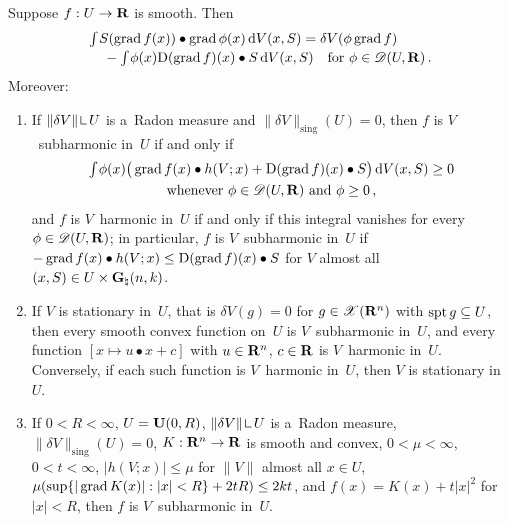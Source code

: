 \begin{lemma}
    \label{al:7.5(2)}
    Suppose $f : U \to \mathbf{R}$ is smooth. Then
    \begin{equation}
        \label{eq:7.5(2):1}
        \begin{multlined}
        \textint{}{} S(\grad f(x)) \bullet \grad \phi(x) \ud V(x,S) = \delta V(\phi \grad f) \\ -
        \textint{}{} \phi(x) \uD(\grad f)(x) \bullet S \ud V(x,S) \quad \text{for $\phi \in
        \dspace{U}{\R}$} \,.
        \end{multlined}
    \end{equation}
    Moreover:
    \begin{enumerate}
        \item If $\|\delta V\| \restrict U$ is a~Radon measure and $\|\delta V\|_{\mathrm{sing}}(U) =
            0$, then $f$ is $V$~subharmonic in~$U$ if and only if
            \begin{gather*}
                {\textstyle\int_{}^{}} \phi(x) \big( \operatorname{grad} f(x) \bullet h(V;x) + \mathrm{D}(\operatorname{grad} f)(x) \bullet S
                \big) \,\mathrm{d} V(x,S) \ge 0 \\ \text{whenever $\phi \in \mathscr{D}(U,\mathbf{R})$ and $\phi \ge 0$}
                \,,
            \end{gather*}
            and $f$ is $V$~harmonic in~$U$ if and only if this integral vanishes for every $\phi
            \in \mathscr{D}(U,\mathbf{R})$; in particular, $f$ is $V$~subharmonic in~$U$ if $- \operatorname{grad} f(x)
            \bullet h(V;x) \le \mathrm{D}(\operatorname{grad} f)(x) \bullet S$ for $V$ almost all $(x,S) \in U \times
            \mathbf{G}_{\natural}(n,k)$.
        \item If $V$ is stationary in~$U$, that is $\delta V(g) = 0$ for $g \in \mathscr{X}(\mathbf{R}^{n})$ with
            $\operatorname{spt} g \subseteq U$, then every smooth convex function on~$U$ is $V$~subharmonic in~$U$,
            and every function $[x \mapsto u \bullet x + c]$ with $u \in \mathbf{R}^{n}$, $c \in \mathbf{R}$ is
            $V$~harmonic in~$U$. Conversely, if each such function is $V$~harmonic in~$U$, then $V$
            is stationary in~$U$.
        \item If $0 < R < \infty$, $U = \mathbf{U}(0,R)$, $\|\delta V\| \restrict U$ is a~Radon measure,
            $\|\delta V\|_{\mathrm{sing}}(U) = 0$, $K : \mathbf{R}^{n} \to \mathbf{R}$ is smooth and convex, $0 <
            \mu < \infty$, $0 < t < \infty$, $|h(V;x)| \le \mu$ for $\|V\|$ almost all $x \in U$,
            $\mu (\sup \{ |\operatorname{grad} K(x)| : |x| < R \} + 2 t R) \le 2 k t$, and $f(x) = K(x) + t
            |x|^2$ for $|x| < R$, then $f$ is $V$~subharmonic in~$U$.
    \end{enumerate}
\end{lemma}

